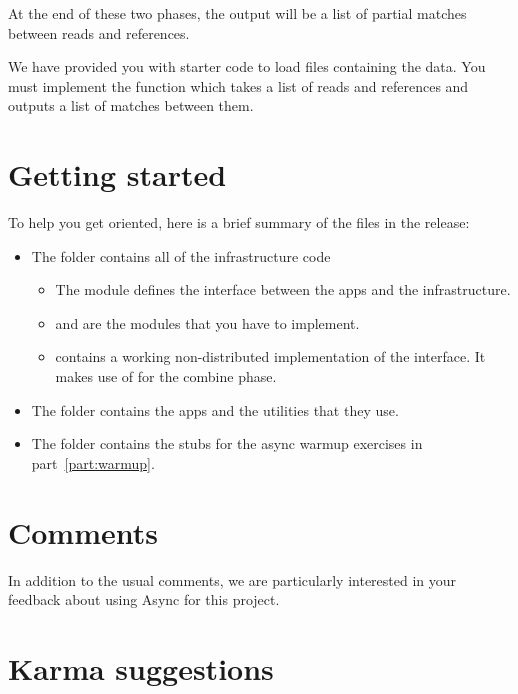 \documentclass{pset}
\begin{document}
At the end of these two phases, the output will be a list of partial matches
between reads and references.

We have provided you with starter code to load files containing the data.  You
must implement the  function which takes a list of
reads and references and outputs a list of matches between them.

\newpage{}
\section*{Getting started}

To help you get oriented, here is a brief summary of the files in the release:
\begin{itemize}
\item The  folder contains all of the infrastructure code \begin{itemize}
    \item The  module defines the interface between the apps
          and the infrastructure.
    \item {} and  are the modules that you
          have to implement.
    \item {} contains a working non-distributed
          implementation of the  interface.  It makes
          use of  for the combine phase.
    \end{itemize}
\item The  folder contains the apps and the utilities that they
      use.
\item The  folder contains the stubs for the async warmup
      exercises in part~\ref{part:warmup}.
\end{itemize}

\section*{Comments}

In addition to the usual comments, we are particularly interested in your
feedback about using Async for this project.

\section*{Karma suggestions}
\end{document}
